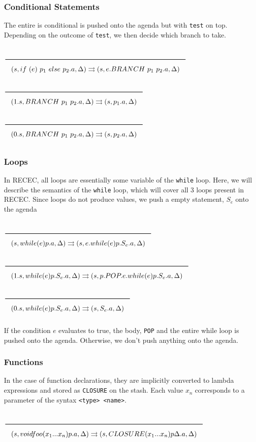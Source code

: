 \documentclass[a4paper]{article}
\newcommand{\Rule}[2]{\genfrac{}{}{0.7pt}{}{{\setlength{\fboxrule}{0pt}\setlength{\fboxsep}{3mm}\fbox{$#1$}}}{{\setlength{\fboxrule}{0pt}\setlength{\fboxsep}{3mm}\fbox{$#2$}}}}
\begin{document}
\subsubsection{Conditional Statements}

The entire is conditional is pushed onto the agenda but with \texttt{test} on top. Depending on the outcome of \texttt{test}, we then decide which branch to take. 

\begin{center}
    $\Rule{}{(s, if \ (e) \ p_1 \ else \ p_2 . a, \Delta) \rightrightarrows (s, e.BRANCH \ p_1 \ p_2.a, \Delta)}$
    \hfill
    $\Rule{}{(1.s, BRANCH \ p_1 \ p_2.a, \Delta) \rightrightarrows (s, p_1.a, \Delta)}$
    \hfill
    $\Rule{}{(0.s, BRANCH \ p_1 \ p_2.a, \Delta) \rightrightarrows (s, p_2.a, \Delta)}$
\end{center}

\subsubsection{Loops}

In RECEC, all loops are essentially some variable of the \texttt{while} loop. Here, we will describe the semantics of the \texttt{while} loop, which will cover all 3 loops present in RECEC. Since loops do not produce values, we push a empty statement, $S_e$ onto the agenda

\begin{center}
    $\Rule{}{(s, while(e) p.a, \Delta) \rightrightarrows (s, e.while(e) p.S_e.a, \Delta)}$
    $\Rule{}{(1.s, while(e) p.S_e.a, \Delta) \rightrightarrows (s, p.POP.e.while(e) p.S_e.a, \Delta)}$
    $\Rule{}{(0.s, while(e) p.S_e.a, \Delta) \rightrightarrows (s, S_e.a, \Delta)}$
\end{center}

If the condition $e$ evaluates to true, the body, \texttt{POP} and the entire while loop is pushed onto the agenda. Otherwise, we don't push anything onto the agenda. 

\subsubsection{Functions}

In the case of function declarations, they are implicitly converted to lambda expressions and stored as \texttt{CLOSURE} on the stash. Each value $x_n$ corresponds to a parameter of the syntax \texttt{<type> <name>}. 

\begin{center}
    $\Rule{}{(s, void foo(x_1 ... x_n) p.a, \Delta) \rightrightarrows (s, CLOSURE(x_1 ... x_n) p \Delta.a, \Delta)}$
\end{center}
\end{document}
